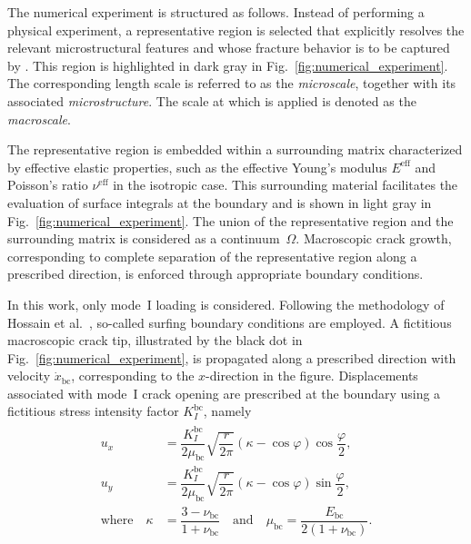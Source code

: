 \documentclass[pdflatex,sn-mathphys-num]{sn-jnl}%
\theoremstyle{thmstyleone}%
\theoremstyle{thmstyletwo}%
\theoremstyle{thmstylethree}%
\begin{document}
The numerical experiment is structured as follows.
Instead of performing a physical experiment, a representative region
 is selected that explicitly resolves the relevant microstructural features and whose fracture behavior is to be captured by .
This region is highlighted in dark gray in Fig.~\ref{fig:numerical_experiment}.
The corresponding length scale is referred to as the \textsl{microscale}, together with its associated \textsl{microstructure}.
The scale at which  is applied is denoted as the \textsl{macroscale}.

The representative  region  is embedded within a surrounding matrix characterized by effective elastic properties, 
such as the effective Young's modulus $E^{\text{eff}}$ and Poisson's ratio $\nu^{\text{eff}}$ in the isotropic case.
This surrounding material facilitates the evaluation of surface integrals at the boundary and is shown in light gray in Fig.~\ref{fig:numerical_experiment}.
The union of the representative region and the surrounding matrix is considered as a continuum~$\Omega$. 
Macroscopic crack growth, corresponding to complete separation of the representative region along a prescribed direction, is enforced through appropriate boundary conditions.

In this work, only mode~I loading is considered.
Following the methodology of Hossain et al.~\cite{hossain_effective_2014}, so-called surfing boundary conditions are employed.
A fictitious macroscopic crack tip, illustrated by the black dot in Fig.~\ref{fig:numerical_experiment}, is propagated along a prescribed direction with velocity $\dot{x}_{\text{bc}}$, 
corresponding to the $x$-direction in the figure.
Displacements associated with mode~I crack opening are prescribed at the boundary using a fictitious 
stress intensity factor $K_I^{\text{bc}}$, namely
\begin{align}
    \begin{split}
        u_x &= \dfrac{K_I^{\text{bc}}}{2\mu_{\text{bc}}}  \sqrt{\dfrac{r}{2\pi}}\left(\kappa - \cos{\varphi}\right)\cos{\dfrac{\varphi}{2}},\\
        u_y &= \dfrac{K_I^{\text{bc}}}{2\mu_{\text{bc}}}  \sqrt{\dfrac{r}{2\pi}}\left(\kappa - \cos{\varphi}\right)\sin{\dfrac{\varphi}{2}},\\
        \text{where} \quad \kappa &= \dfrac{3 - \nu_{\text{bc}}}{1 + \nu_{\text{bc}}} \quad \text{and} \quad \mu_{\text{bc}} = \dfrac{E_{\text{bc}}}{2\left(1 + \nu_{\text{bc}}\right)}.
        \label{eq:surfing-bcs}
    \end{split}
\end{align}
\end{document}
